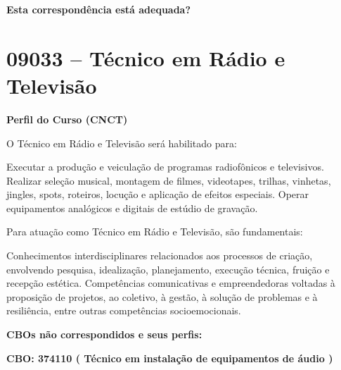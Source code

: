 \documentclass[
]{article}
\begin{document}
\begin{Form}
\textbf{Esta correspondência está adequada?} \\ 
\end{Form}

\newpage
\section{ 09033 -- Técnico em Rádio e Televisão }

\textbf{Perfil do Curso (CNCT)}

O Técnico em Rádio e Televisão será habilitado para:

Executar a produção e veiculação de programas radiofônicos e
televisivos. Realizar seleção musical, montagem de filmes, videotapes,
trilhas, vinhetas, jingles, spots, roteiros, locução e aplicação de
efeitos especiais. Operar equipamentos analógicos e digitais de estúdio
de gravação.

Para atuação como Técnico em Rádio e Televisão, são fundamentais:

Conhecimentos interdisciplinares relacionados aos processos de criação,
envolvendo pesquisa, idealização, planejamento, execução técnica,
fruição e recepção estética. Competências comunicativas e empreendedoras
voltadas à proposição de projetos, ao coletivo, à gestão, à solução de
problemas e à resiliência, entre outras competências socioemocionais.

\textbf{CBOs não correspondidos e seus perfis:}

\textbf{CBO: 374110  ( Técnico em instalação de equipamentos de áudio )}
\end{document}
